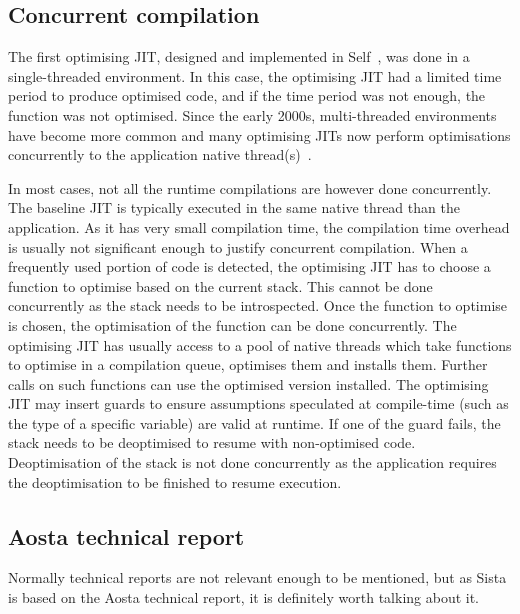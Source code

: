 \documentclass[a4paper,12pt,twoside]{../includes/ThesisStyle}
\begin{document}
\subsection{Concurrent compilation}

The first optimising JIT, designed and implemented in Self~\cite{UrsPHD}, was done in a single-threaded environment. In this case, the optimising JIT had a limited time period to produce optimised code, and if the time period was not enough, the function was not optimised. Since the early 2000s, multi-threaded environments have become more common and many optimising JITs now perform optimisations concurrently to the application native thread(s)~\cite{Arn00,Stad12a}.

In most cases, not all the runtime compilations are however done concurrently. The baseline JIT is typically executed in the same native thread than the application. As it has very small compilation time, the compilation time overhead is usually not significant enough to justify concurrent compilation. When a frequently used portion of code is detected, the optimising JIT has to choose a function to optimise based on the current stack. This cannot be done concurrently as the stack needs to be introspected. Once the function to optimise is chosen, the optimisation of the function can be done concurrently. The optimising JIT has usually access to a pool of native threads which take functions to optimise in a compilation queue, optimises them and installs them. Further calls on such functions can use the optimised version installed. The optimising JIT may insert guards to ensure assumptions speculated at compile-time (such as the type of a specific variable) are valid at runtime. If one of the guard fails, the stack needs to be deoptimised to resume with non-optimised code. Deoptimisation of the stack is not done concurrently as the application requires the deoptimisation to be finished to resume execution. 

\subsection{Aosta technical report}

Normally technical reports are not relevant enough to be mentioned, but as Sista is based on the Aosta technical report\cite{Mira02c}, it is definitely worth talking about it.
\end{document}
